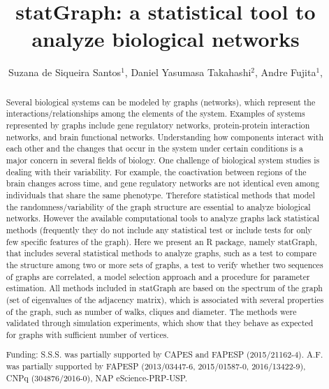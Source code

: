 \documentclass[twoside]{article}
\title{\vspace{-15mm}\fontsize{24pt}{10pt}\selectfont\textbf{ statGraph: a statistical tool to analyze biological networks }} %
\author{ Suzana de Siqueira Santos$^{1}$, Daniel Yasumasa Takahashi$^{2}$, Andre Fujita$^{1}$, }
\affil{ 1 IME - USP

2 Department of Psychology and Neuroscience Institute, Princeton University, Princeton, United States of America

 }
\date{}
\begin{document}
  
  
  \maketitle %
  
  
  \thispagestyle{fancy} %
  
  
  \begin{abstract}
  Several biological systems can be modeled by graphs (networks), which represent the interactions/relationships among the elements of the system. Examples of systems represented by graphs include gene regulatory networks, protein-protein interaction networks, and brain functional networks. Understanding how components interact with each other and the changes that occur in the system under certain conditions is a major concern in several fields of biology. One challenge of biological system studies is dealing with their variability. For example, the coactivation between regions of the brain changes across time, and gene regulatory networks are not identical even among individuals that share the same phenotype. Therefore statistical methods that model the randomness/variability of the graph structure are essential to analyze biological networks. However the available computational tools to analyze graphs lack statistical methods (frequently they do not include any statistical test or include tests for only few specific features of the graph). Here we present an R package, namely statGraph, that includes several statistical methods to analyze graphs, such as a test to compare the structure among two or more sets of graphs, a test to verify whether two sequences of graphs are correlated, a model selection approach and a procedure for parameter estimation. All methods included in statGraph are based on the spectrum of the graph (set of eigenvalues of the adjacency matrix), which is associated with several properties of the graph, such as number of walks, cliques and diameter. The methods were validated through simulation experiments, which show that they behave as expected for graphs with sufficient number of vertices.
  
  Funding: S.S.S. was partially supported by CAPES and FAPESP (2015/21162-4). A.F. was partially supported by FAPESP (2013/03447-6, 2015/01587-0, 2016/13422-9), CNPq (304876/2016-0), NAP eScience-PRP-USP. \\ 
  \end{abstract}
  
\end{document}

